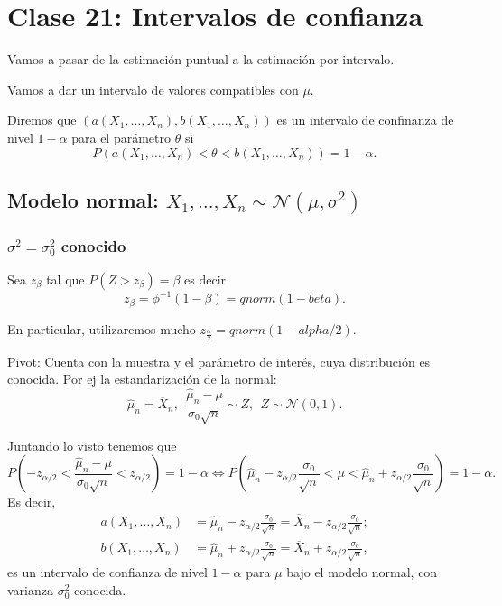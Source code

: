 \documentclass[a4paper,12pt]{article}
\theoremstyle{definition}
\numberwithin{prop}{section}
\theoremstyle{remark}
\numberwithin{ej_subseccion}{subsection}
\begin{document}
	\section*{Clase 21: Intervalos de confianza}
	
	Vamos a pasar de la estimación puntual a la estimación por
	intervalo.
	
	Vamos a dar un intervalo de valores compatibles con $\mu$.
	
	Diremos que $(a(X_1,\dots,X_n),b(X_1,\dots,X_n))$ es un intervalo	de confinanza de nivel $1-\alpha$ para el parámetro $\theta$ si
	$$P(a(X_1,\dots,X_n)<\theta<b(X_1,\dots,X_n))=1-\alpha.$$
	
	\subsection*{Modelo normal: $X_1,\dots,X_n\sim\mathcal{N}(\mu,\sigma^2)$}
	
	\subsubsection*{$\sigma^2=\sigma_0^2$ conocido}
	Sea $z_{\beta}$ tal que $P(Z>z_{\beta})=\beta$ es decir
	$$z_{\beta}=\phi^{-1}(1-\beta)=qnorm(1-beta).$$
	
	En particular, utilizaremos mucho $z_{\frac{\alpha}{2}}=qnorm(1-alpha/2)$.
	
	\underline{Pivot}: Cuenta con la muestra y el parámetro de interés, cuya distribución es conocida. Por ej la estandarización de la normal:
	$$\hat{\mu}_n=\overline{X}_n,\ \ \frac{\hat{\mu}_n-\mu}{\sigma_0\sqrt{n}}\sim Z,\ \ Z\sim\mathcal{N}(0,1).$$
	
	Juntando lo visto tenemos que 
	$$P(-z_{\alpha/2}<\frac{\hat{\mu}_n-\mu}{\sigma_0\sqrt{n}}<z_{\alpha/2})=1-\alpha \iff P(\hat{\mu}_n-z_{\alpha/2}\frac{\sigma_0}{\sqrt{n}}<\mu<\hat{\mu}_n+z_{\alpha/2}\frac{\sigma_0}{\sqrt{n}})=1-\alpha.$$
	Es decir, 
	\begin{align*}
		a(X_1,\dots,X_n)&=\hat{\mu}_n-z_{\alpha/2}\frac{\sigma_0}{\sqrt{n}}=\overline{X}_n-z_{\alpha/2}\frac{\sigma_0}{\sqrt{n}};\\ b(X_1,\dots,X_n)&=\hat{\mu}_n+z_{\alpha/2}\frac{\sigma_0}{\sqrt{n}}=\overline{X}_n+z_{\alpha/2}\frac{\sigma_0}{\sqrt{n}},
	\end{align*}
	es un intervalo de confianza de nivel $1-\alpha$ para $\mu$ bajo el modelo normal, con varianza $\sigma_0^2$ conocida.
	
\end{document}
